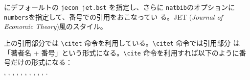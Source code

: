 \documentclass[10pt]{jarticle}
\begin{document}
\verb|| にデフォールトの \verb|jecon_jet.bst| を指定し、さらに
\verb|natbib|のオプションに\verb|numbers|を指定して、番号での引用をおこなってい
る。JET (\textit{Journal of Economic Theory})風のスタイル。
\vspace{1em}\\



\vspace{1em}

上の引用部分では \verb|\citet| 命令を利用している。\verb|\citet| 命令では引用部分
は「著者名 + 番号」という形式になる。\verb|\cite| 命令を利用すれば以下のように番
号だけの形式になる：\\
\cite{40020418914}, \cite{yamazaki13:_japan},
\cite{takeda2013jecon}, \cite{Takeda2012a}, \cite{arimura-takeda2012},
\cite{matloff__2012}, \cite{Boswell-2012}, \cite{takeda2012_cge},
\cite{Takeda2011b}, \cite{takeda2011c}, \cite{40018847518}.

\nocite{*}


% 


\end{document}
